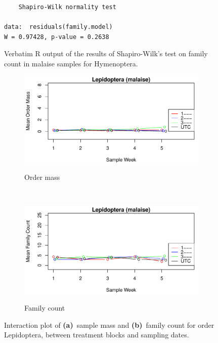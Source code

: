 \documentclass[10pt,letterpaper,twocolumn]{article}
\begin{document}
\begin{figure}[h]
	\lstset{numbers=left}
	\lstset{xleftmargin=5mm,framexleftmargin=5mm}
	\begin{lstlisting}
	Shapiro-Wilk normality test

data:  residuals(family.model)
W = 0.97428, p-value = 0.2638
	\end{lstlisting}
	\caption{Verbatim R output of the results of Shapiro-Wilk's test on family count in malaise samples for Hymenoptera.}
	\label{fig:malaise_hymenoptera_family_shapiro}
	\smallskip
	\nointerlineskip
	\hrulefill
\end{figure}

\begin{figure}[h]
	\centering
	\begin{subfigure}[b]{0.45\textwidth}
		\caption{Order mass}
		\includegraphics[width=\textwidth]{plots/blocks/interaction/mass/mass_malaise_Lepidoptera_interplot.pdf}
		\label{fig:malaise_lepidoptera_mass_interplot}
	\end{subfigure}
	~
	\begin{subfigure}[b]{0.45\textwidth}
		\caption{Family count}
		\includegraphics[width=\textwidth]{plots/blocks/interaction/family/family_malaise_Lepidoptera_interplot.pdf}
		\label{fig:malaise_lepidoptera_family_interplot}
	\end{subfigure}
	\caption{Interaction plot of \textbf{(a)}~sample mass and \textbf{(b)}~family count for order Lepidoptera, between treatment blocks and sampling dates.}
	\label{fig:malaise_lepidoptera_interplot}
	\smallskip
	\nointerlineskip
	\hrulefill
\end{figure}
\end{document}
